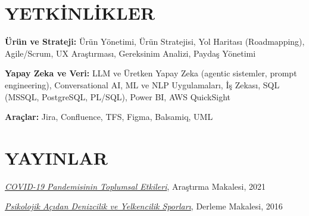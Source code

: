 \documentclass[10pt,letterpaper]{article}
\begin{document}
\section{YETKİNLİKLER}
\textbf{Ürün ve Strateji:} Ürün Yönetimi, Ürün Stratejisi, Yol Haritası (Roadmapping), Agile/Scrum, UX Araştırması, Gereksinim Analizi, Paydaş Yönetimi\par
\vspace{1pt}
\textbf{Yapay Zeka ve Veri:} LLM ve Üretken Yapay Zeka (agentic sistemler, prompt engineering), Conversational AI, ML ve NLP Uygulamaları, İş Zekası, SQL (MSSQL, PostgreSQL, PL/SQL), Power BI, AWS QuickSight\par
\vspace{1pt}
\textbf{Araçlar:} Jira, Confluence, TFS, Figma, Balsamiq, UML

\section{YAYINLAR}
\href{https://jag.journalagent.com/turkhijyen/pdfs/THDBD_78_3_235_248.pdf}{\textit{COVID-19 Pandemisinin Toplumsal Etkileri}}, Araştırma Makalesi, 2021\par
\vspace{1pt}
\href{https://sporbilimleri.com.tr/yayin/psikolojik-acidan-denizcilik-ve-yelkencilik-sporlari}{\textit{Psikolojik Açıdan Denizcilik ve Yelkencilik Sporları}}, Derleme Makalesi, 2016
\end{document}
